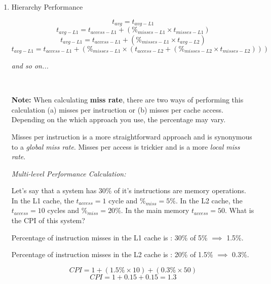 \documentclass[12pt]{article}
\newenvironment{QandA}{\begin{enumerate}[label=\bfseries\arabic*.]\bfseries}
                      {\end{enumerate}}
\newenvironment{answered}{\par\quad\normalfont}{}
\begin{document}
\begin{QandA}
\begin{answered}
\textit{Design Choice \#2:} \textbf{Inclusive} Memory or \textbf{Exclusive} Memory. In an \textit{Inclusive} design, a block in L1 is always in L2. In an \textit{Exclusive} design, a block is either in L1 or L2, never in both.
\end{answered}

\ 

\item Hierarchy Performance
\begin{answered}
\begin{equation*}
    t_{avg} = t_{avg-L1}
\end{equation*}
\begin{equation*}
    t_{avg-L1} = t_{access-L1} + (\%_{misses-L1} \times t_{misses-L1})
\end{equation*}
\begin{equation*}
    t_{avg-L1} = t_{access-L1} + (\%_{misses-L1} \times t_{avg-L2})
\end{equation*}
\begin{equation*}
    t_{avg-L1} = t_{access-L1} + (\%_{misses-L1} \times (t_{access-L2} + (\%_{misses-L2} \times t_{misses-L2})))
\end{equation*}

\textit{and so on...}

\ 

\textbf{Note:} When calculating \textbf{miss rate}, there are two ways of performing this calculation (a) misses per instruction or (b) misses per cache access. Depending on the which approach you use, the percentage may vary. 

Misses per instruction is a more straightforward approach and is synonymous to a \textit{global miss rate}. Misses per access is trickier and is a more \textit{local miss rate}. 

\newpage 

\textit{Multi-level Performance Calculation:}

Let's say that a system has 30\% of it's instructions are memory operations. In the L1 cache, the $t_{access}=1$ cycle and $\%_{miss}=5\%$. In the L2 cache, the $t_{access}=10$ cycles and $\%_{miss}=20\%$. In the main memory $t_{access}=50$. What is the CPI of this system?

Percentage of instruction misses in the L1 cache is : 30\% of 5\% $\implies$ 1.5\%.

Percentage of instruction misses in the L2 cache is : 20\% of 1.5\% $\implies$ 0.3\%.

\begin{equation*}
    CPI = 1 + (1.5\% \times 10) + (0.3\% \times 50)
\end{equation*}
\begin{equation*}
    CPI = 1 + 0.15 + 0.15 = 1.3
\end{equation*}
\end{answered}
\end{QandA}
\end{document}
